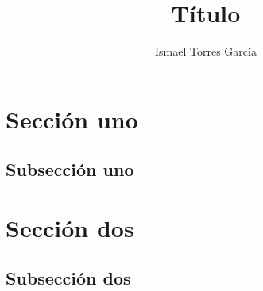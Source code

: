 \documentclass{scrartcl} %
\title{Título}
\author{Ismael Torres García}
\begin{document}
\maketitle

\begin{abstract}
  \lipsum[1]
\end{abstract}

\tableofcontents

\section{Sección uno}
\lipsum[1-2]

\subsection{Subsección uno}
\lipsum[1-2]

\section{Sección dos}
\lipsum[1-2]

\subsection{Subsección dos}
\lipsum[1-2]

\printbibliography
\end{document}
